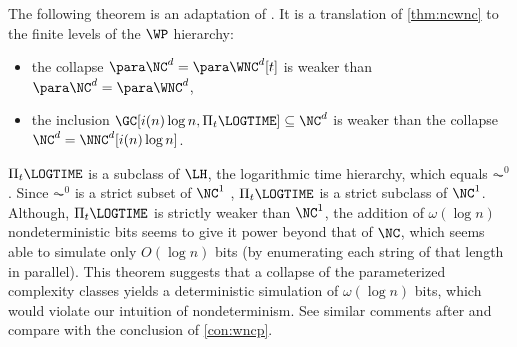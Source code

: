 \documentclass{article}
\begin{document}
The following theorem is an adaptation of \autocite[Theorem~4.3]{cc97npo}.
It is a translation of \autoref{thm:ncwnc} to the finite levels of the $\WP$ hierarchy:
\begin{itemize}
\item the collapse $\para \NC^d = \para \WNC^d[t]$ is weaker than $\para \NC^d = \para \WNC^d$,
\item the inclusion $\GC[i(n) \log n, \Pi_t \LOGTIME] \subseteq \NC^d$ is weaker than the collapse $\NC^d = \NNC^d[i(n) \log n]$.
\end{itemize}
$\Pi_t \LOGTIME$ is a subclass of $\LH$, the logarithmic time hierarchy, which equals $\AC^0$ \autocite[Corollary~5.32]{immerman99}.
Since $\AC^0$ is a strict subset of $\NC^1$ \autocite{fss84}, $\Pi_t \LOGTIME$ is a strict subclass of $\NC^1$.
Although, $\Pi_t \LOGTIME$ is strictly weaker than $\NC^1$, the addition of $\omega(\log n)$ nondeterministic bits seems to give it power beyond that of $\NC$, which seems able to simulate only $O(\log n)$ bits (by enumerating each string of that length in parallel).
This theorem suggests that a collapse of the parameterized complexity classes yields a deterministic simulation of $\omega(\log n)$ bits, which would violate our intuition of nondeterminism.
See similar comments after \autocite[Theorem~4.3]{cc97npo} and compare with the conclusion of \autoref{con:wncp}.
\end{document}
